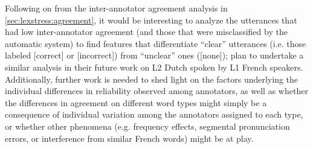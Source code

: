 Following on from the inter-annotator agreement analysis in \cref{sec:lexstress:agreement}, it would be interesting to analyze the utterances that had low inter-annotator agreement (and those that were misclassified by the automatic system) to find features that differentiate ``clear'' utterances (i.e. those labeled [correct] or [incorrect]) from ``unclear'' ones ([none]); \textcite{Michaux2013} plan to undertake a similar analysis in their future work on L2 Dutch spoken by L1 French speakers. Additionally, further work is needed to shed light on the factors underlying the individual differences in reliability observed among annotators, as well as whether the differences in agreement on different word types might simply be a consequence of individual variation among the annotators assigned to each type, or whether other phenomena (e.g. frequency effects, segmental pronunciation errors, or interference from similar French words) might be at play.





	




